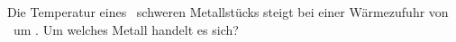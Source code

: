 Die Temperatur eines \mMeO\ schweren Metallstücks steigt bei einer Wärmezufuhr von \QMeO\ um \dTO. Um welches Metall handelt es sich?
